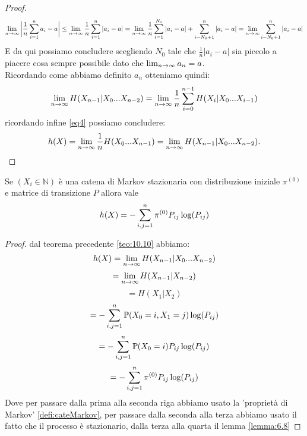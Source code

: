 \begin{proof}
$$\lim_{n\to \infty} \bigg| \frac{1}{n} \sum_{i=1}^n a_i-a \bigg| \leq \lim_{n\to \infty} \frac{1}{n} \sum_{i=1}^n |a_i-a| = \lim_{n\to \infty} \frac{1}{n} \sum_{i=1}^{N_0} |a_i-a| + \sum_{i=N_0+1}^{n} |a_i-a|= \lim_{n\to \infty} \sum_{i=N_0+1}^{n} |a_i-a|$$
E da qui possiamo concludere scegliendo $N_0$ tale che $\frac{1}{n}|a_i-a|$ sia piccolo a piacere cosa sempre possibile dato che $\lim_{n\to \infty} a_n=a$.\\
Ricordando come abbiamo definito $a_n$ otteniamo quindi:
\begin{equation}
\lim_{n\to \infty} H(X_{n-1}|X_0...X_{n-2})=\lim_{n\to \infty} \frac{1}{n} \sum_{i=0}^{n-1}H(X_i|X_0...X_{i-1})
\end{equation}
ricordando infine \ref{eq4} possiamo concludere:
$$h(X)=\lim_{n\to \infty} \frac{1}{n} H(X_0...X_{n-1}) = \lim_{n\to \infty} H(X_{n-1}|X_0...X_{n-2}).$$
\end{proof}
\begin{teo}
Se $(X_i\in \mathbb{N})$ è una catena di Markov stazionaria con distribuzione iniziale $\pi^{(0)}$ e matrice di transizione $P$ allora vale
\begin{equation}
h(X)=-\sum_{i,j=1}^n \pi^{(0)} P_{ij} \log (P_{ij})
\end{equation}
\end{teo}
\begin{proof}
dal teorema precedente \ref{teo:10.10} abbiamo:
$$h(X)=\lim_{n\to \infty} H(X_{n-1}|X_0...X_{n-2})$$
$$=\lim_{n\to \infty} H(X_{n-1}|X_{n-2})$$
$$=H(X_1|X_2)$$
$$=-\sum_{i,j=1}^n \mathbb{P}(X_0=i,X_1=j)\log (P_{ij})$$
$$=-\sum_{i,j=1}^n \mathbb{P}(X_0=i)P_{ij}\log (P_{ij})$$
$$=-\sum_{i,j=1}^n \pi^{(0)}P_{ij}\log (P_{ij})$$
Dove per passare dalla prima alla seconda riga abbiamo usato la 'proprietà di Markov' \ref{defi:cateMarkov}, per passare dalla seconda alla terza abbiamo usato il fatto che il processo è stazionario, dalla terza alla quarta il lemma \ref{lemma:6.8}
\end{proof}





